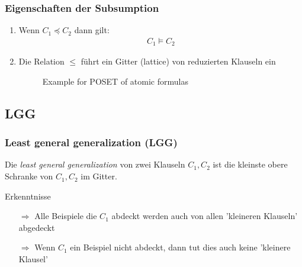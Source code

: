 \begin{frame}
	\frametitle{Eigenschaften der Subsumption}
	\begin{enumerate}
		\item {
			Wenn $C_1 \preceq C_2$ dann gilt:
			\begin{align*}
				C_1 \vDash C_2
			\end{align*}
		}
		\item{ Die Relation $\leq$ führt ein Gitter (lattice) von reduzierten Klauseln ein
			\begin{figure}[H]
				\begin{center}
				\end{center}
				\caption{Example for POSET of atomic formulas}
				\label{fig:poset_atomic}
			\end{figure}
		}
	\end{enumerate}
\end{frame}

\subsection{LGG}
\begin{frame}
	\frametitle{Least general generalization (LGG)}
	 Die \textit{least general generalization} von zwei Klauseln $C_1, C_2$ ist
	 die kleinste obere Schranke von $C_1,C_2$ im Gitter.

	\begin{block}{Erkenntnisse}
			\begin{itemize}
				\item [$\Rightarrow$] Alle Beispiele die $C_1$ abdeckt werden auch von
				allen 'kleineren Klauseln' abgedeckt
				\item[$\Rightarrow$] Wenn $C_1$ ein Beispiel nicht abdeckt,
				dann tut dies auch keine 'kleinere Klausel'
			\end{itemize}
	 \end{block}
\end{frame}

